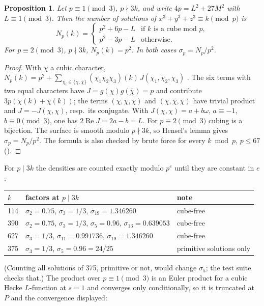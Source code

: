 \documentclass[11pt,a4paper]{article}
\newtheorem{proposition}{Proposition}
\theoremstyle{remark}
\newcommand{\code}[1]{\path{#1}}
\begin{document}
\begin{proposition}\label{prop:np}
Let $p\equiv1\pmod3$, $p\nmid3k$, and write $4p=L^2+27M^2$ with $L\equiv1\pmod3$. Then the number of
solutions of $x^3+y^3+z^3\equiv k\pmod p$ is
\[
  N_p(k)=\begin{cases}p^2+6p-L&\text{if $k$ is a cube mod $p$},\\ p^2-3p-L&\text{otherwise.}\end{cases}
\]
For $p\equiv2\pmod3$, $p\nmid3k$, $N_p(k)=p^2$. In both cases $\sigma_p=N_p/p^2$.
\end{proposition}
\begin{proof}
With $\chi$ a cubic character, $N_p(k)=p^2+\sum_{\chi_i\in\{\chi,\bar\chi\}}(\chi_1\chi_2\chi_3)(k)\,
J(\chi_1,\chi_2,\chi_3)$ \cite[Ch.~8, \S7]{IR}. The six terms with two equal characters have
$J=g(\chi)g(\bar\chi)=p$ and contribute $3p(\chi(k)+\bar\chi(k))$; the terms $(\chi,\chi,\chi)$ and
$(\bar\chi,\bar\chi,\bar\chi)$ have trivial product and $J=-J(\chi,\chi)$, resp.\ its conjugate.
With $J(\chi,\chi)=a+b\omega$, $a\equiv-1$, $b\equiv0\pmod3$, one has $2\operatorname{Re}J=2a-b=L$.
For $p\equiv2\pmod3$ cubing is a bijection. The surface is smooth modulo $p\nmid3k$, so Hensel's lemma
gives $\sigma_p=N_p/p^2$. The formula is also checked by brute force for every $k\bmod p$,
$p\le67$ (\code{tests/test_rho.py}).
\end{proof}

For $p\mid3k$ the densities are counted exactly modulo $p^e$ until they are constant in $e$:

\begin{center}
\begin{tabular}{lll}
\toprule
$k$ & factors at $p\mid3k$ & note\\
\midrule
114 & $\sigma_2=0.75$, $\sigma_3=1/3$, $\sigma_{19}=1.346260$ & cube-free\\
390 & $\sigma_2=0.75$, $\sigma_3=1/3$, $\sigma_5=0.96$, $\sigma_{13}=0.639053$ & cube-free\\
627 & $\sigma_3=1/3$, $\sigma_{11}=0.991736$, $\sigma_{19}=1.346260$ & cube-free\\
375 & $\sigma_3=1/3$, $\sigma_5=0.96=24/25$ & primitive solutions only\\
\bottomrule
\end{tabular}
\end{center}

\noindent (Counting all solutions of 375, primitive or not, would change $\sigma_5$; the test suite
checks that.) The product over $p\equiv1\pmod3$ is an Euler product for a cubic Hecke $L$-function at
$s=1$ and converges only conditionally, so it is truncated at $P$ and the convergence displayed:
\end{document}
